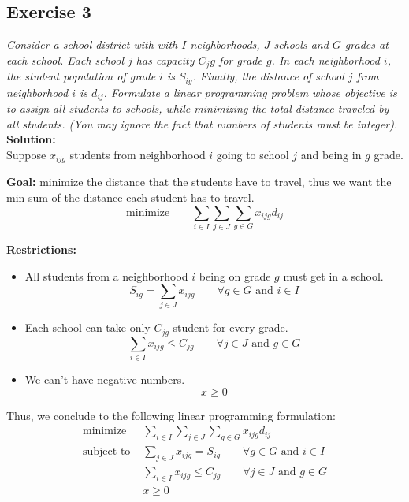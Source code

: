 \documentclass[12pt]{article}
\begin{document}
\subsection*{Exercise 3}
\textit{Consider a school district with with $I$ neighborhoods, $J$ schools and $G$ grades at each school. Each school $j$ has capacity $C_jg$ for grade $g$. In each neighborhood $i$, the student population of grade $i$ is $S_{ig}$. Finally, the distance of school $j$ from neighborhood $i$ is $d_{ij}$. Formulate a linear programming problem whose objective is to assign all students to schools, while minimizing the total distance traveled by all students. (You may ignore the fact that numbers of students must be integer).} \newline
\textbf{Solution:} \\
Suppose $x_{ijg}$ students from neighborhood $i$ going to school $j$ and being in $g$ grade. \par
\textbf{Goal:} minimize the distance that the students have to travel, thus we want the min sum of the distance each student has to travel. 
\begin{equation}
\text{minimize} \qquad \sum_{i \in I} \sum_{j \in J} \sum_{g \in G} x_{ijg}d_{ij} 
\end{equation} \par 
\textbf{Restrictions:}
\begin{itemize}
\item All students from a neighborhood $i$ being on grade $g$ must get in a school.
	\begin{equation}
	S_{ig} = \sum_{j \in J} x_{ijg} \qquad \forall g \in G \text{ and } i \in I	
	\end{equation}
\item Each school can take only $C_{jg}$ student for every grade. 
	\begin{equation}
		\sum_{i \in I} x_{ijg} \leqslant C_{jg} \qquad \forall j \in J \text{ and } g \in G	
	\end{equation}
\item We can't have negative numbers. 
	\begin{equation}
		x \geqslant 0
	\end{equation}
\end{itemize}
Thus, we conclude to the following linear programming formulation: 
\begin{align*}
\text{minimize } &\sum_{i \in I} \sum_{j \in J} \sum_{g \in G} x_{ijg}d_{ij} \\
\text{subject to } &\sum_{j \in J} x_{ijg} = S_{ig}  \qquad \forall g \in G \text{ and } i \in I \\
&\sum_{i \in I} x_{ijg} \leqslant C_{jg} \qquad \forall j \in J \text{ and } g \in G \\
&x \geqslant 0
\end{align*}
\end{document}
